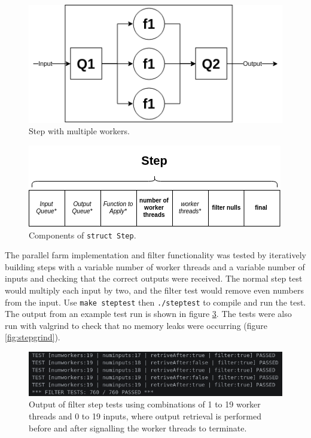 \documentclass[12pt]{article}
\def\code#1{\texttt{#1}}
\begin{document}
\begin{figure}[!ht]
	\centering 
	\includegraphics[width=0.8\linewidth]{images/farm}
	\caption{Step with multiple workers.}
	\label{fig:multiplestep}
\end{figure}

\begin{figure}[!ht]
	\centering 
	\includegraphics[width=0.8\linewidth]{images/stepstruc}
	\caption{Components of \code{struct Step}.}
	\label{fig:stepstruc}
\end{figure}

The parallel farm implementation and filter functionality was tested by iteratively building steps with a variable number of worker threads and a variable number of inputs and checking that the correct outputs were received. The normal step test would multiply each input by two, and the filter test would remove even numbers from the input. Use \code{make steptest} then \code{./steptest} to compile and run the test. The output from an example test run is shown in figure \ref{fig:steptest}. The tests were also run with valgrind to check that no memory leaks were occurring (figure \ref{fig:stepgrind}).

\begin{figure}[!ht]
	\centering 
	\includegraphics[width=\linewidth]{images/steptest}
	\caption{Output of filter step tests using combinations of 1 to 19 worker threads and 0 to 19 inputs, where output retrieval is performed before and after signalling the worker threads to terminate.}
	\label{fig:steptest}
\end{figure}
\end{document}
